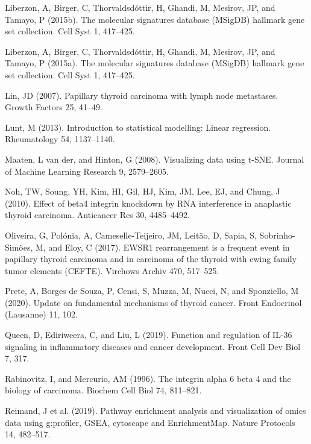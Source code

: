 \documentclass[
  parskip,
  oneside]{scrreprt}
\newlength{\cslhangindent}
\newlength{\cslentryspacingunit} %
\newenvironment{CSLReferences}[2] %
 {%
  \setlength{\parindent}{0pt}
  \ifodd #1
  \let\oldpar\par
  \def\par{\hangindent=\cslhangindent\oldpar}
  \fi
  \setlength{\parskip}{#2\cslentryspacingunit}
 }%
 {}
\begin{document}
\begin{CSLReferences}{0}{0}
\leavevmode{}%
Liberzon, A, Birger, C, Thorvaldsdóttir, H, Ghandi, M, Mesirov, JP, and
Tamayo, P (2015b). The molecular signatures database (MSigDB) hallmark
gene set collection. Cell Syst 1, 417--425.

\leavevmode{}%
Liberzon, A, Birger, C, Thorvaldsdóttir, H, Ghandi, M, Mesirov, JP, and
Tamayo, P (2015a). The molecular signatures database (MSigDB) hallmark
gene set collection. Cell Syst 1, 417--425.

\leavevmode{}%
Lin, JD (2007). Papillary thyroid carcinoma with lymph node metastases.
Growth Factors 25, 41--49.

\leavevmode{}%
Lunt, M (2013). Introduction to statistical modelling: Linear
regression. Rheumatology 54, 1137--1140.

\leavevmode{}%
Maaten, L van der, and Hinton, G (2008). Visualizing data using t-SNE.
Journal of Machine Learning Research 9, 2579--2605.

\leavevmode{}%
Noh, TW, Soung, YH, Kim, HI, Gil, HJ, Kim, JM, Lee, EJ, and Chung, J
(2010). Effect of {beta}4 integrin knockdown by RNA interference in
anaplastic thyroid carcinoma. Anticancer Res 30, 4485--4492.

\leavevmode{}%
Oliveira, G, Polónia, A, Cameselle-Teijeiro, JM, Leitão, D, Sapia, S,
Sobrinho-Simões, M, and Eloy, C (2017). EWSR1 rearrangement is a
frequent event in papillary thyroid carcinoma and in carcinoma of the
thyroid with ewing family tumor elements (CEFTE). Virchows Archiv 470,
517--525.

\leavevmode{}%
Prete, A, Borges de Souza, P, Censi, S, Muzza, M, Nucci, N, and
Sponziello, M (2020). Update on fundamental mechanisms of thyroid
cancer. Front Endocrinol (Lausanne) 11, 102.

\leavevmode{}%
Queen, D, Ediriweera, C, and Liu, L (2019). Function and regulation of
IL-36 signaling in inflammatory diseases and cancer development. Front
Cell Dev Biol 7, 317.

\leavevmode{}%
Rabinovitz, I, and Mercurio, AM (1996). The integrin alpha 6 beta 4 and
the biology of carcinoma. Biochem Cell Biol 74, 811--821.

\leavevmode{}%
Reimand, J et al. (2019). Pathway enrichment analysis and visualization
of omics data using g:profiler, GSEA, cytoscape and EnrichmentMap.
Nature Protocols 14, 482--517.


\end{CSLReferences}
\end{document}
